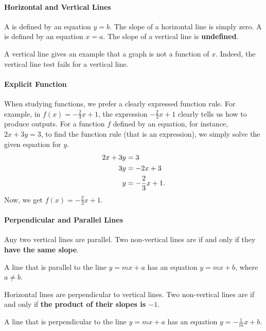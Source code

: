 
\paragraph*{Horizontal and Vertical Lines}

	A  is defined by an equation $y=b$. The slope of a horizontal line is simply zero.
	A  is defined by an equation $x=a$. The slope of a vertical line is \textbf{undefined}.

	A vertical line gives an example that a graph is not a function of $x$. Indeed,
	the vertical line test fails for a vertical line.



\paragraph*{Explicit Function}
		When studying functions, we prefer a clearly expressed function rule. For example, in $f(x)=-\frac23x+1$, the expression $-\frac23x+1$ clearly tells us how to produce outputs.  For a function $f$ defined by an equation, for instance, $2x+3y=3$, to find the function rule (that is an expression), we simply solve the given equation for $y$.
		\[
			\begin{split}
				2x+3y&=3\\
				3y&=-2x+3\\
				y&=-\frac23x+1. \vspace*{-1em}
			\end{split}
		\]
		Now, we get $f(x)=-\frac23x+1$.


\paragraph*{Perpendicular and Parallel Lines}
		Any two vertical lines are parallel. Two non-vertical lines are  if and only if they \textbf{have the same slope}.

		A line that is parallel to the line $y=mx+a$ has an equation $y=mx+b$, where $a\neq b$.

		Horizontal lines are perpendicular to vertical lines. Two non-vertical lines are  if and only if \textbf{the product of their slopes is $-1$}.

		A line that is perpendicular to the line $y=mx+a$ has an equation $y=-\frac1m x+b$.


